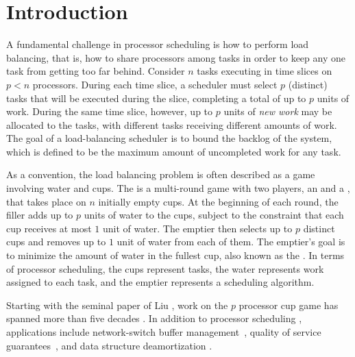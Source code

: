 \section{Introduction}\label{sec:intro}

A fundamental challenge in processor scheduling is how to perform load balancing, that is, how to share processors among tasks in order to keep any one task from getting too far behind. Consider $n$ tasks executing in time slices on $p < n$ processors. During each time slice, a scheduler must select $p$ (distinct) tasks that will be executed during the slice, completing a total of up to $p$ units of work. During the same time slice, however, up to $p$ units of \emph{new work} may be allocated to the tasks, with different tasks receiving different amounts of work. The goal of a load-balancing scheduler is to bound the backlog of the system, which is defined to be the maximum amount of uncompleted work for any task.

As a convention, the load balancing problem is often described as a game involving water and cups. The  is a multi-round game with two players, an  and a , that takes place on $n$ initially empty cups. At the beginning of each round, the filler adds up to $p$ units of water to the cups, subject to the constraint that each cup receives at most $1$ unit of water. The emptier then selects up to $p$ distinct cups and removes up to $1$ unit of water from each of them. The emptier's goal is to minimize the amount of water in the fullest cup, also known as the . In terms of processor scheduling, the cups represent tasks, the water represents work assigned to each task, and the emptier represents a scheduling algorithm.

Starting with the seminal paper of Liu \cite{Liu69}, work on the $p$ processor cup game has spanned more than five decades \cite{BaruahCoPl96,GkasieniecKl17,BaruahGe95,LitmanMo11,LitmanMo05,MoirRa99,BarNi02,GuanYi12,Liu69, LiuLa73,DietzRa91, BenderFaKu19, Kuszmaul20, AdlerBeFr03, DietzSl87, LitmanMo09}. In addition to processor scheduling \cite{BaruahCoPl96,GkasieniecKl17,BaruahGe95,LitmanMo11,LitmanMo05,MoirRa99,BarNi02,GuanYi12,Liu69, LiuLa73, AdlerBeFr03, LitmanMo09, DietzRa91}, applications include network-switch buffer management~\cite{Goldwasser10,AzarLi06,RosenblumGoTa04,Gail93}, quality of service guarantees~\cite{BaruahCoPl96,AdlerBeFr03,LitmanMo09}, and data structure deamortization \cite{AmirFaId95,DietzRa91,DietzSl87,AmirFr14,Mortensen03,GoodrichPa13,FischerGa15,Kopelowitz12,BenderDaFa20}.


